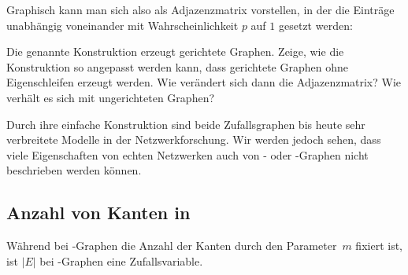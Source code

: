 \noindent
Graphisch kann man sich also \Gnp als Adjazenzmatrix vorstellen, in der die Einträge unabhängig voneinander mit Wahrscheinlichkeit $p$ auf $1$ gesetzt werden:

\begin{center}

\end{center}

\begin{exercise}
    Die genannte Konstruktion erzeugt gerichtete Graphen.
    Zeige, wie die Konstruktion so angepasst werden kann, dass gerichtete Graphen ohne Eigenschleifen erzeugt werden.
    Wie verändert sich dann die Adjazenzmatrix?
    Wie verhält es sich mit ungerichteten Graphen?
\end{exercise}

Durch ihre einfache Konstruktion sind beide Zufallsgraphen bis heute sehr verbreitete Modelle in der Netzwerkforschung.
Wir werden jedoch sehen, dass viele Eigenschaften von echten Netzwerken auch von \Gnp- oder \Gnm-Graphen nicht beschrieben werden können.

\subsection{Anzahl von Kanten in \Gnp}\label{subsec:anzahl_kanten_in_gnp}
Während bei \Gnm-Graphen die Anzahl der Kanten durch den Parameter~$m$ fixiert ist, ist $|E|$ bei \Gnp-Graphen eine Zufallsvariable.

